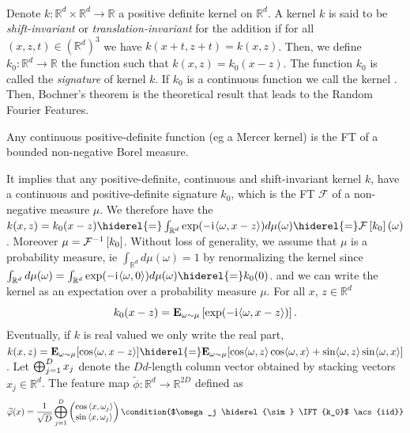 \documentclass[twoside,11pt]{article}
\begin{document}
\paragraph{}
Denote $k: \mathbb{R}^d \times \mathbb{R}^d \to \mathbb{R}$ a positive
definite kernel \citep{Aronszajn1950} on $\mathbb{R}^d$. A kernel $k$ is said
to be \emph{shift-invariant} or \emph{translation-invariant} for the addition
if for all $(x,z,t) \in \left(\mathbb{R}^d\right)^3$ we have $k(x+t,z+t) =
k(x,z)$.  Then, we define $k_0: \mathbb{R}^d \to \mathbb{R}$ the function such
that $k(x,z)= k_0(x-z)$. The function $k_0$ is called the \emph{signature} of
kernel $k$. If $k_0$ is a continuous function we call the kernel .
Then, Bochner's theorem \citep{folland1994course} is the theoretical result
that leads to the Random Fourier Features.
\begin{theorem}\label{th:bochner-scalar}
    Any continuous positive-definite function (\acs{eg} a Mercer kernel) is the
    \acl{FT} of a bounded non-negative Borel measure.
\end{theorem}
It implies that any positive-definite, continuous and shift-invariant kernel
$k$, have a continuous and positive-definite signature $k_0$, which is the
\acl{FT} $\mathcal{F}$ of a non-negative measure $\mu$. We therefore have the
$k(x,z)=k_0(x-z) \hiderel{=} \int_{\mathbb{R}^d} \exp(-\iu \inner{\omega,x -
z}) d\mu(\omega) \hiderel{=}\FT{k_0}(\omega)$.  Moreover $\mu = \mathcal{F}^{-1}\left[k_0\right]$.
Without loss of generality, we assume that $\mu$ is a probability measure,
\acs{ie} $\int_{\mathbb{R}^d} d\mu(\omega)=1$ by renormalizing the kernel since
$\int_{\mathbb{R}^d}d\mu(\omega)= \int_{\mathbb{R}^d}\exp(-\iu \inner{\omega,
0})d\mu(\omega)\hiderel{=}k_0(0)$.  and we can write the kernel as an
expectation over a probability measure $\mu$.  For all $x$, $z\in\mathbb{R}^d$
\begin{dmath*}
    k_0(x-z) = \expectation_{\omega\sim\mu}\left[\exp(-\iu \inner{\omega,x -
    z})\right].
\end{dmath*}
Eventually, if $k$ is real valued we only write the real part, $k(x,z) =
\expectation_{\omega\sim\mu}[\cos \inner{\omega,x - z}] \hiderel{=}
\expectation_{\omega\sim\mu}[ \cos \inner{\omega,z} \cos \inner{\omega,x} +
\sin \inner{\omega,z} \sin \inner{\omega,x}]$.  Let $\operatorname*{\bigoplus}_{j=1}^D x_j$ denote
the $Dd$-length column vector obtained by stacking vectors $x_j \in
\mathbb{R}^d$.  The feature map $\widetilde{\phi}: \mathbb{R}^d \rightarrow
\mathbb{R}^{2D}$ defined as
\begin{dmath}
    \label{eq:rff}
    \widetilde{\phi}(x)=\frac{1}{\sqrt{D}}\Vect_{j=1}^D
    \begin{pmatrix}
        \cos{\inner{x,\omega_j}} \\
        \sin{\inner{x,\omega_j}}
    \end{pmatrix}\condition{$\omega_j \hiderel{\sim} \IFT{k_0}$ \acs{iid}}
\end{dmath}
\end{document}
